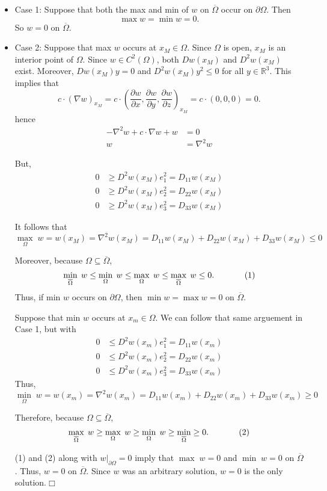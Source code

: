 \documentclass[11pt]{article}
\begin{document}
\begin{itemize}
\item Case 1: Suppose that both the max and min of $w$ on $\overline{\Omega}$ occur on $\partial \Omega$. Then 
\[
\max w=\min w=0.
\]
\noindent So $w=0$ on $\overline{\Omega}$.

\item Case 2: Suppose that max $w$ occurs at $x_M\in \Omega$. Since $\Omega$ is open, $x_M$ is an interior point of $\Omega$. Since $w\in C^2(\Omega)$, both $Dw(x_M)$ and $D^2w(x_M)$ exist. Moreover, $Dw(x_M)y=0$ and $D^2w(x_M)y^2\leq 0$ for all $y\in \mathbb{R}^3$. This implies that 
\[
c\cdot \left(\nabla w\right)_{x_M}=c\cdot \left(\frac{\partial w}{\partial x},\frac{\partial w}{\partial y},\frac{\partial w}{\partial z}\right)_{x_M}=c\cdot \left(0,0,0\right)=0.
\]
hence
\begin{align*}
-\nabla ^2w+c\cdot \nabla w + w&=0 \\ w&=\nabla ^2w
\end{align*}

\noindent But, 
\begin{align*}
0&\geq D^2w(x_M)e_1^2=D_{11}w(x_M) \\ 0&\geq D^2w(x_M)e_2^2=D_{22}w(x_M) \\ 0&\geq D^2w(x_M)e_3^2=D_{33}w(x_M)
\end{align*}

\noindent It follows that 
\[
\max\limits_{\Omega}\;w=w(x_M)=\nabla ^2w(x_M)=D_{11}w(x_M)+D_{22}w(x_M)+D_{33}w(x_M)\leq 0
\]

\noindent Moreover, because $\Omega\subseteq \overline{\Omega}$,
\[
\min\limits_{\overline{\Omega}}\;w \leq \min\limits_{\Omega}\;w \leq \max\limits_{\Omega}\;w \leq \max\limits_{\overline{\Omega}}\;w \leq 0.\hspace{.5in}(1)
\]
\noindent Thus, if min $w$ occurs on $\partial\Omega$, then $\min w=\max w=0$ on $\overline{\Omega}$.

\vspace{.1in}

Suppose that min $w$ occurs at $x_m\in \Omega$. We can follow that same arguement in Case 1, but with
\begin{align*}
0&\leq D^2w(x_m)e_1^2=D_{11}w(x_m) \\ 0&\leq D^2w(x_m)e_2^2=D_{22}w(x_m) \\ 0&\leq D^2w(x_m)e_3^2=D_{33}w(x_m)
\end{align*}
Thus, 
\[
\min\limits_{\Omega}\;w=w(x_m)=\nabla ^2w(x_m)=D_{11}w(x_m)+D_{22}w(x_m)+D_{33}w(x_m)\geq 0
\]

\noindent Therefore, because $\Omega\subseteq \overline{\Omega}$,
\[
\max\limits_{\overline{\Omega}}\;w\geq \max\limits_\Omega\;w\geq \min\limits_\Omega\;w\geq\min\limits_{\overline{\Omega}}\geq 0.\hspace{.5in}(2)
\]

\vspace{.2in} (1) and (2) along with $w|_{\partial\Omega}=0$ imply that $\max\;w=0$ and $\min\;w=0$ on $\overline{\Omega}$. Thus, $w=0$ on $\overline{\Omega}$.  Since $w$ was an arbitrary solution, $w=0$ is the only solution.\hfill $\Box$


\end{itemize}
\end{document}
